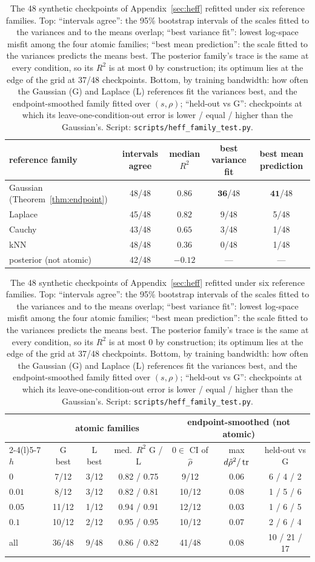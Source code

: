 \documentclass{article}
\theoremstyle{plain}
\theoremstyle{remark}
\begin{document}
\begin{table}[htb]
\centering\small
\begin{tabular}{lcccc}
\toprule
reference family & intervals agree & median $R^2$ & best variance fit & best mean prediction\\
\midrule
Gaussian (Theorem~\ref{thm:endpoint}) & 48/48 & $\mathbf{0.86}$ & $\mathbf{36}$/48 & $\mathbf{41}$/48\\
Laplace & 45/48 & $0.82$ & 9/48 & 5/48\\
Cauchy & 43/48 & $0.65$ & 3/48 & 1/48\\
kNN & 48/48 & $0.36$ & 0/48 & 1/48\\
posterior (not atomic) & 42/48 & $-0.12$ & --- & ---\\
\bottomrule
\end{tabular}

\vspace{6pt}
\setlength{\tabcolsep}{4pt}
\begin{tabular}{lcccccc}
\toprule
& \multicolumn{3}{c}{atomic families} & \multicolumn{3}{c}{endpoint-smoothed (not atomic)}\\
\cmidrule(lr){2-4}\cmidrule(l){5-7}
$h$ & G best & L best & med.\ $R^2$ G / L & $0\in$ CI of $\hat\rho$ &
max $d\hat\rho^2/\operatorname{tr}$ & held-out vs G\\
\midrule
$0$ & 7/12 & 3/12 & 0.82 / 0.75 & 9/12 & 0.06 & 6 / 4 / 2\\
$0.01$ & 8/12 & 3/12 & 0.82 / 0.81 & 10/12 & 0.08 & 1 / 5 / 6\\
$0.05$ & 11/12 & 1/12 & 0.94 / 0.91 & 12/12 & 0.03 & 1 / 6 / 5\\
$0.1$ & 10/12 & 2/12 & 0.95 / 0.95 & 10/12 & 0.07 & 2 / 6 / 4\\
all & 36/48 & 9/48 & 0.86 / 0.82 & 41/48 & 0.08 & 10 / 21 / 17\\
\bottomrule
\end{tabular}
\caption{The 48 synthetic checkpoints of Appendix~\ref{sec:heff} refitted under six
reference families. Top: ``intervals agree'': the 95\% bootstrap intervals of the scales
fitted to the variances and to the means overlap; ``best variance fit'': lowest log-space
misfit among the four atomic families; ``best mean prediction'': the scale fitted to the
variances predicts the means best. The posterior family's trace is the same at every
condition, so its $R^2$ is at most $0$ by construction; its optimum lies at the edge of
the grid at 37/48 checkpoints. Bottom, by training bandwidth: how often the Gaussian (G)
and Laplace (L) references fit the variances best, and the endpoint-smoothed family
fitted over $(s,\rho)$; ``held-out vs G'': checkpoints at which its
leave-one-condition-out error is lower / equal / higher than the Gaussian's. Script:
\texttt{scripts/heff\_family\_test.py}.}
\label{tab:families}
\end{table}
\end{document}
